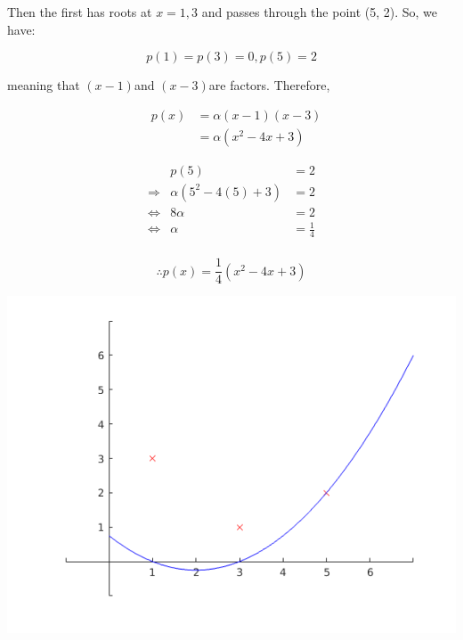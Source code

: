 \documentclass[MathsNotesBase.tex]{subfiles}
\begin{document}
{	
	\begin{par}
	\begin{flushleft}
	Then the first has roots at $x=1,3$ and passes through the point (5, 2). So, we have:
	\end{flushleft}
	\end{par}
	
	\begin{par}
	$$p(1)=p(3)=0, p(5) = 2$$
	\end{par}
	
	\begin{par}
	\begin{flushleft}
	meaning that $\left(x-1\right)$and $\left(x-3\right)$are factors. Therefore,
	\end{flushleft}
	\end{par}
	
	\begin{par}
	$$\begin{array}{lcr}
	&p(x) &= \alpha(x-1)(x-3)\\
	&&= \alpha(x^2-4x+3)
	\end{array}$$
	\end{par}
	
	\begin{par}
	$$\begin{array}{lcr}
	&p(5)&=2 \\
	\Longrightarrow &\alpha(5^2-4(5) + 3) &= 2 \\
	\iff &8\alpha&=2\\
	\iff &\alpha &= \frac{1}{4}\\
	\end{array}$$
	\end{par}
	
	\begin{par}
	$$\therefore p(x) = \frac{1}{4}(x^2-4x+3)$$
	\end{par}
	
	
	\begin{center}
	\includegraphics[width=\linewidth]{figure_1.png}
	\end{center}
	
}
\end{document}
